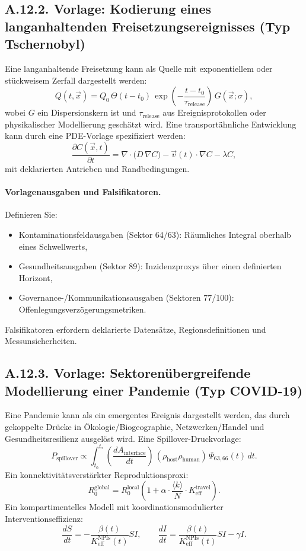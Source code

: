 \documentclass[13pt,a4paper]{article}
\begin{document}
	\subsection*{A.12.2. Vorlage: Kodierung eines langanhaltenden Freisetzungsereignisses (Typ Tschernobyl)}
	
	Eine langanhaltende Freisetzung kann als Quelle mit exponentiellem oder stückweisem Zerfall dargestellt werden:
	$$ Q(t,\vec{x}) = Q_0\,\Theta(t-t_0)\,\exp\!\left(-\frac{t-t_0}{\tau_{\mathrm{release}}}\right)\,G(\vec{x};\sigma), $$
	wobei $G$ ein Dispersionskern ist und $\tau_{\mathrm{release}}$ aus Ereignisprotokollen oder physikalischer Modellierung geschätzt wird. Eine transportähnliche Entwicklung kann durch eine PDE-Vorlage spezifiziert werden:
	$$ \frac{\partial C(\vec{x},t)}{\partial t}
	= \nabla\cdot\big(D\,\nabla C\big) - \vec{v}(t)\cdot\nabla C - \lambda C, $$
	mit deklarierten Antrieben und Randbedingungen.
	
	\paragraph{Vorlagenausgaben und Falsifikatoren.}
	Definieren Sie:
	\begin{itemize}[leftmargin=*]
		\item Kontaminationsfeldausgaben (Sektor 64/63): Räumliches Integral oberhalb eines Schwellwerts,
		\item Gesundheitsausgaben (Sektor 89): Inzidenzproxys über einen definierten Horizont,
		\item Governance-/Kommunikationsausgaben (Sektoren 77/100): Offenlegungsverzögerungsmetriken.
	\end{itemize}
	Falsifikatoren erfordern deklarierte Datensätze, Regionsdefinitionen und Messunsicherheiten.
	
	\subsection*{A.12.3. Vorlage: Sektorenübergreifende Modellierung einer Pandemie (Typ COVID-19)}
	
	Eine Pandemie kann als ein emergentes Ereignis dargestellt werden, das durch gekoppelte Drücke in Ökologie/Biogeographie, Netzwerken/Handel und Gesundheitsresilienz ausgelöst wird. Eine Spillover-Druckvorlage:
	$$ P_{\mathrm{spillover}} \propto \int_{t_0}^{t_{*}}
	\left(\frac{dA_{\mathrm{interface}}}{dt}\right)\,
	\left(\rho_{\mathrm{host}}\rho_{\mathrm{human}}\right)\,
	\Psi_{63,66}(t)\,dt. $$
	Ein konnektivitätsverstärkter Reproduktionsproxi:
	$$ R_0^{\mathrm{global}} = R_0^{\mathrm{local}}\left(1+\alpha\cdot \frac{\langle k\rangle}{N}\cdot K_{\mathrm{eff}}^{\mathrm{travel}}\right). $$
	Ein kompartimentelles Modell mit koordinationsmodulierter Interventionseffizienz:
	$$ \frac{dS}{dt} = - \frac{\beta(t)}{K_{\mathrm{eff}}^{\mathrm{NPIs}}(t)}SI,\qquad
	\frac{dI}{dt} = \frac{\beta(t)}{K_{\mathrm{eff}}^{\mathrm{NPIs}}(t)}SI - \gamma I. $$
	
\end{document}

